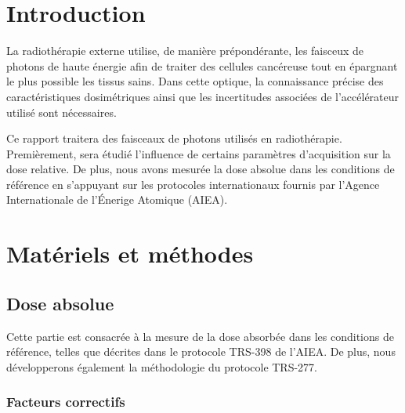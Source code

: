 \documentclass{article}
\begin{document}




\onehalfspacing

\pagestyle{fancy}
	\renewcommand\headrulewidth{0.5pt}
	\renewcommand\footrulewidth{0.5pt}
	\fancyfoot[R]{\thepage}

\tableofcontents
\clearpage
\section{Introduction}

La radiothérapie externe utilise, de manière prépondérante, les faisceux de photons de haute énergie afin de traiter des cellules cancéreuse tout en épargnant le plus possible les tissus sains. Dans cette optique, la connaissance précise des caractéristiques dosimétriques ainsi que les incertitudes associées de l'accélérateur utilisé sont nécessaires. 

Ce rapport traitera des faisceaux de photons utilisés en radiothérapie. Premièrement, sera étudié l'influence de certains paramètres d'acquisition sur la dose relative. De plus, nous avons mesurée la dose absolue dans les conditions de référence en s'appuyant sur les protocoles internationaux fournis par l'Agence Internationale de l'Énerige Atomique (AIEA).

\section{Matériels et méthodes}
\subsection{Dose absolue}

Cette partie est consacrée à la mesure de la dose absorbée dans les conditions de référence, telles que décrites dans le protocole TRS-398 de l'AIEA. De plus, nous développerons également la méthodologie du protocole TRS-277.

\subsubsection{Facteurs correctifs}
\end{document}
